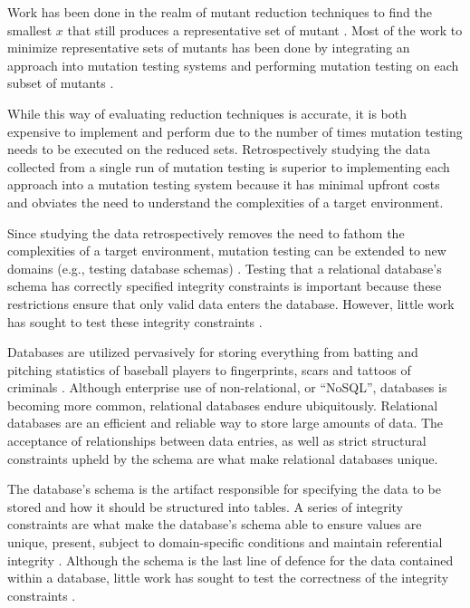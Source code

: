 Work has been done in the realm of mutant reduction techniques to find the smallest $x$ that still produces
a representative set of mutant \cite{jia2011analysis, mathur1994empirical}. Most of the work
to minimize representative sets of mutants has been done by integrating an approach into
mutation testing systems and performing mutation testing on each subset of mutants \cite{demillo1988extended, king1991fortran}.

While this way of evaluating reduction techniques is accurate, it is both
expensive to implement and perform due to the number of times mutation testing
needs to be executed on the reduced sets. Retrospectively studying the data
collected from a single run of mutation testing is superior to implementing each
approach into a mutation testing system because it has minimal upfront costs and obviates the need
to understand the complexities of a target environment.

Since studying the data retrospectively removes the need to fathom the complexities of a target environment,
mutation testing can be extended to new domains (e.g., testing database schemas) \cite{mcminn2016virtual, mcminn2015effectiveness, wright2013efficient}.
Testing that a relational database's schema has correctly specified integrity constraints is important
because these restrictions ensure that only valid data enters the database. However, little work has
sought to test these integrity constraints \cite{mcminn2016virtual}.

Databases are utilized pervasively for storing everything from batting and pitching statistics of baseball
players \cite{lahmanbaseball} to fingerprints, scars and tattoos of criminals \cite{ngi}.
Although enterprise use of non-relational, or ``NoSQL'', databases is becoming more common,
relational databases endure ubiquitously.
Relational databases are an efficient and reliable way to store large amounts of data.
The acceptance of relationships between data entries, as well as strict structural constraints
upheld by the schema are what make relational databases unique.

The database's schema is the artifact responsible for specifying the data to be stored and
how it should be structured into tables. A series of integrity constraints
are what make the database's schema able to ensure values are unique, present,
subject to domain-specific conditions and maintain referential integrity \cite{mcminn2016virtual}.
Although the schema is the last line of defence for the data contained
within a database, little work has sought to test the correctness of the integrity constraints \cite{mcminn2015effectiveness}.


